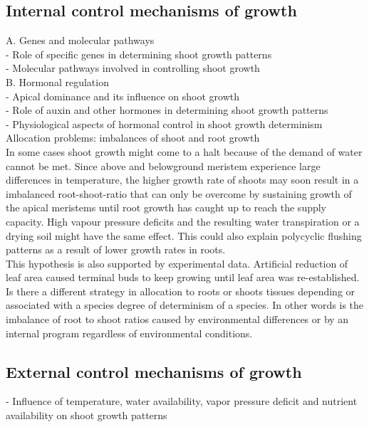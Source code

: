 \documentclass{article}
\begin{document}
	
	\subsection*{Internal control mechanisms of growth}
	A. Genes and molecular pathways\\
	- Role of specific genes in determining shoot growth patterns\\
	- Molecular pathways involved in controlling shoot growth \\
	
	B. Hormonal regulation \\
	- Apical dominance and its influence on shoot growth\\
	- Role of auxin and other hormones in determining shoot growth patterns\\
	- Physiological aspects of hormonal control in shoot growth determinism\\
	
	
	Allocation problems: imbalances of shoot and root growth\\
	In some cases shoot growth might come to a halt because of the demand of water cannot be met. Since above and belowground meristem experience large differences in temperature, the higher growth rate of shoots may soon result in a imbalanced root-shoot-ratio that can only be overcome by sustaining growth of the apical meristems until root growth has caught up to reach the supply capacity. High vapour pressure deficits and the resulting water transpiration or a drying soil might have the same effect. This could also explain polycyclic flushing patterns as a result of lower growth rates in roots.\\
	This hypothesis is also supported by experimental data. Artificial reduction of leaf area caused terminal buds to keep growing until leaf area was re-established.
	Is there a different strategy in allocation to roots or shoots tissues depending or associated with a species degree of determinism of a species. In other words is the imbalance of root to shoot ratios caused by environmental differences or by an internal program regardless of environmental conditions. \\
	
	
	\subsection*{External control mechanisms of growth}
	- Influence of temperature, water availability, vapor pressure deficit and nutrient availability on shoot growth patterns\\
	
\end{document}
